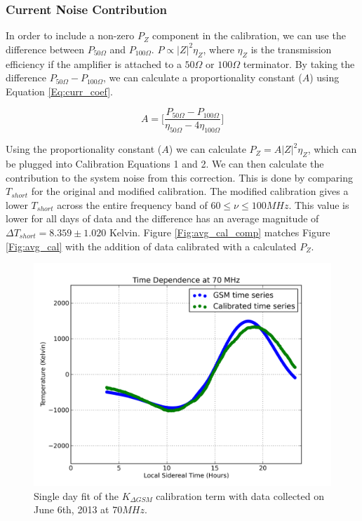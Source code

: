 \subsubsection{Current Noise Contribution}

In order to include a non-zero $P_Z$ component in the calibration, we can use the difference between $P_{50 \Omega}$ and $P_{100 \Omega}$. $P \propto |Z|^2 \eta_{Z}$, where $\eta_Z$ is the transmission efficiency if the amplifier is attached to a $50 \Omega$ or $100 \Omega$ terminator. By taking the difference $P_{50 \Omega}-P_{100 \Omega}$, we can calculate a proportionality constant ($A$) using Equation \ref{Eq:curr_coef}.

\begin{equation}\label{Eq:curr_coef}
A = \Big[ \frac{P_{50 \Omega} - P_{100 \Omega}}{\eta_{50 \Omega} - 4 \eta_{100 \Omega}} \Big]
\end{equation}

Using the proportionality constant ($A$) we can calculate $P_{Z} = A |Z|^2 \eta_{Z}$, which can be plugged into Calibration Equations 1 and 2. We can then calculate the contribution to the system noise from this correction. This is done by comparing $T_{short}$ for the original and modified calibration. The modified calibration gives a lower $T_{short}$ across the entire frequency band of $60 \leq \nu \leq 100 MHz$. This value is lower for all days of data and the difference has an average magnitude of $\Delta T_{short} = 8.359 \pm 1.020$ Kelvin. Figure \ref{Fig:avg_cal_comp} matches Figure \ref{Fig:avg_cal} with the addition of data calibrated with a calculated $P_{Z}$.


\begin{figure}[htb]
\begin{center}
\includegraphics[width=0.95\linewidth]{Data_analysis/figures/June_06_K_dgsm_time_series.png}
\caption{Single day fit of the $K_{\Delta GSM}$ calibration term with data collected on June 6th, 2013 at $70 MHz$. }
\label{Fig:Kdgsm}
\end{center}
\end{figure}

